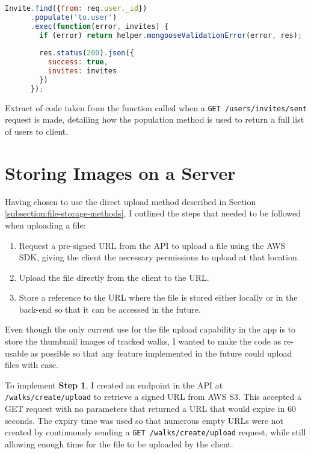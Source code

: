 \begin{listing}
  \centering
  \begin{lstlisting}[language=javascript]
Invite.find({from: req.user._id})
      .populate('to.user')
      .exec(function(error, invites) {
        if (error) return helper.mongooseValidationError(error, res);
          
        res.status(200).json({
          success: true,
          invites: invites
        })
      });
  \end{lstlisting}
  \caption{Extract of code taken from the function called when a \texttt{GET /users/invites/sent} request is made, detailing how the population method is used to return a full list of users to client.}
  \label{listing:invite-populate}
\end{listing}

\section{Storing Images on a Server} \label{implementation:storing-images}

Having chosen to use the direct upload method described in Section \ref{subsection:file-storage-methods}, I outlined the steps that needed to be followed when uploading a file:

\begin{enumerate}[label=\textbf{Step \arabic*}]
  \item Request a pre-signed URL from the API to upload a file using the AWS SDK, giving the client the necessary permissions to upload at that location.
  \item Upload the file directly from the client to the URL.
  \item Store a reference to the URL where the file is stored either locally or in the back-end so that it can be accessed in the future.
\end{enumerate}

Even though the only current use for the file upload capability in the app is to store the thumbnail images of tracked walks, I wanted to make the code as re-usable as possible so that any feature implemented in the future could upload files with ease.

To implement \textbf{Step 1}, I created an endpoint in the API at \texttt{/walks/create/upload} to retrieve a signed URL from AWS S3. This accepted a GET request with no parameters that returned a URL that would expire in 60 seconds. The expiry time was used so that numerous empty URLs were not created by continuously sending a \texttt{GET /walks/create/upload} request, while still allowing enough time for the file to be uploaded by the client.

